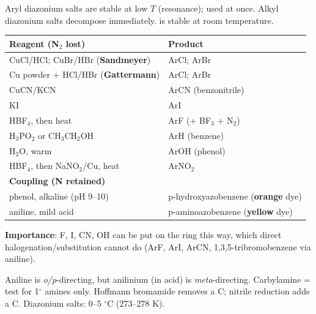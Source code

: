 \documentclass[9pt,a4paper]{extarticle}
\newcommand{\nr}[1]{\textbf{\color{uc!85!black}#1}}
\begin{document}
\begin{multicols}{2}
\begin{kbox}
Aryl diazonium salts are stable at low $T$ (resonance); used at once. Alkyl diazonium salts decompose immediately.  is stable at room temperature.
\end{kbox}
{\scriptsize\setlength{\tabcolsep}{2pt}
\begin{tabularx}{\linewidth}{@{}l Y@{}}
\toprule
\textbf{Reagent (N$_2$ lost)} & \textbf{Product}\\
\midrule
CuCl/HCl; CuBr/HBr (\nr{Sandmeyer}) & ArCl; ArBr\\
Cu powder + HCl/HBr (\nr{Gattermann}) & ArCl; ArBr\\
CuCN/KCN & ArCN (benzonitrile)\\
KI & ArI\\
HBF$_4$, then heat & ArF (+ BF$_3$ + N$_2$)\\
H$_3$PO$_2$ or CH$_3$CH$_2$OH & ArH (benzene)\\
H$_2$O, warm & ArOH (phenol)\\
HBF$_4$, then NaNO$_2$/Cu, heat & ArNO$_2$\\
\midrule
\textbf{Coupling (N retained)} & \\
phenol, alkaline (pH 9--10) & p-hydroxyazobenzene (\textbf{orange} dye)\\
aniline, mild acid & p-aminoazobenzene (\textbf{yellow} dye)\\
\bottomrule
\end{tabularx}\par}
\begin{fl}
\item \textbf{Importance}: F, I, CN, OH can be put on the ring this way, which direct halogenation/substitution cannot do (ArF, ArI, ArCN, 1,3,5-tribromobenzene via aniline).
\end{fl}
\begin{tip}\Tip Aniline is \emph{o/p}-directing, but anilinium (in acid) is \emph{meta}-directing. Carbylamine = test for 1$^\circ$ amines only. Hoffmann bromamide removes a C; nitrile reduction adds a C. Diazonium salts: 0--5 $^\circ$C (273--278 K).\end{tip}


\end{multicols}
\end{document}
